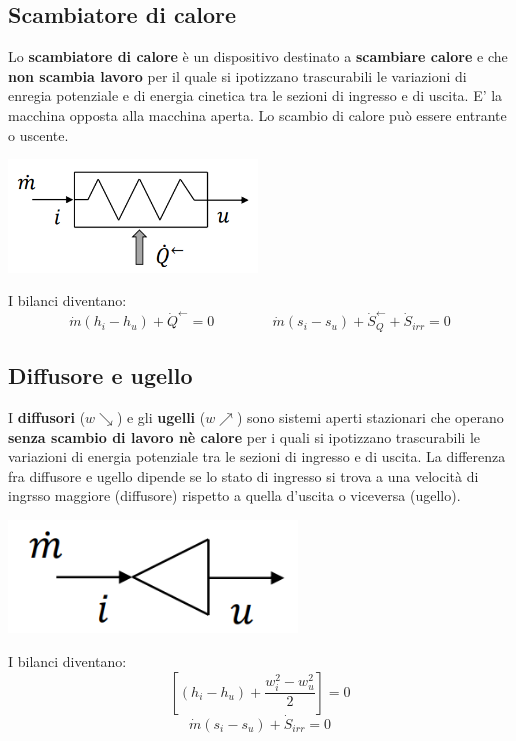 \subsection{Scambiatore di calore}
Lo \textbf{scambiatore di calore} è un dispositivo destinato a \textbf{scambiare calore} e che \textbf{non scambia lavoro} per il quale si ipotizzano trascurabili le variazioni di enregia potenziale e di energia cinetica tra le sezioni di ingresso e di uscita.\newline
E' la macchina opposta alla macchina aperta.\newline
Lo scambio di calore può essere entrante o uscente.
\begin{center}
    \includegraphics[height=3cm]{../L06/img5.PNG}
\end{center}
I bilanci diventano:
\[
    \dot{m} (h_i - h_u) + \dot{Q}^\leftarrow  = 0 \;\;\;\;\;\;\;\;\;\;\;\;\;\;\;\dot{m} (s_i -s_u) + \dot{S}_Q^\leftarrow  + \dot{S}_{irr} = 0
\]
\subsection{Diffusore e ugello}
I \textbf{diffusori} ($w \searrow$) e gli \textbf{ugelli} ($w \nearrow$) sono sistemi aperti stazionari che operano \textbf{senza scambio di lavoro nè calore} per i quali si ipotizzano trascurabili le variazioni di energia potenziale tra le sezioni di ingresso e di uscita.\newline
La differenza fra diffusore e ugello dipende se lo stato di ingresso si trova a una velocità di ingrsso maggiore (diffusore) rispetto a quella d'uscita o viceversa (ugello).
\begin{center}
    \includegraphics[height=3cm]{../L06/img6.PNG}
\end{center}
I bilanci diventano:
\[
    \left[(h_i - h_u) + \frac{w_i^2 - w_u^2}{2}\right] = 0
\]
\[
    \dot{m} (s_i - s_u) + \dot{S}_{irr} = 0
\]
